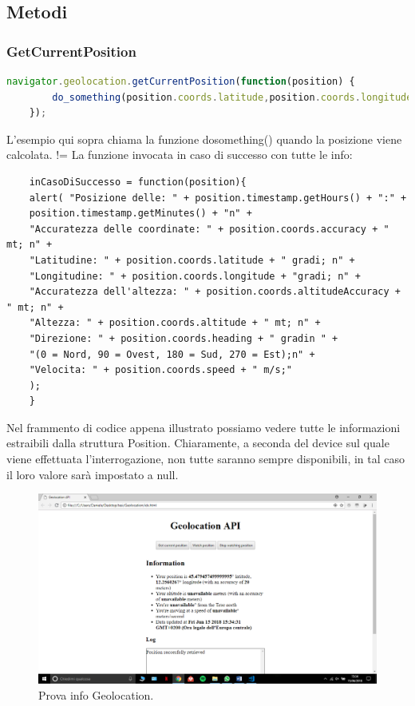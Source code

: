 \documentclass[italian]{article}
\begin{document}
	\subsection{Metodi}
	\subsubsection{GetCurrentPosition}
	\begin{lstlisting}[language=JavaScript]
	navigator.geolocation.getCurrentPosition(function(position) {
		do_something(position.coords.latitude,position.coords.longitude);
	});
	\end{lstlisting}
	\begin{flushleft}
		L'esempio qui sopra chiama la funzione dosomething() quando la posizione viene calcolata.
		!=
		La funzione invocata in caso di successo con tutte le info:
	\end{flushleft}
\pagebreak
	\begin{lstlisting}
	inCasoDiSuccesso = function(position){ 
	alert( "Posizione delle: " + position.timestamp.getHours() + ":" +
	position.timestamp.getMinutes() + "n" + 
	"Accuratezza delle coordinate: " + position.coords.accuracy + " mt; n" + 
	"Latitudine: " + position.coords.latitude + " gradi; n" + 
	"Longitudine: " + position.coords.longitude + "gradi; n" + 
	"Accuratezza dell'altezza: " + position.coords.altitudeAccuracy + " mt; n" + 
	"Altezza: " + position.coords.altitude + " mt; n" + 
	"Direzione: " + position.coords.heading + " gradin " +
	"(0 = Nord, 90 = Ovest, 180 = Sud, 270 = Est);n" + 
	"Velocita: " + position.coords.speed + " m/s;"
	);
	}
	\end{lstlisting}
	\begin{flushleft}
		Nel frammento di codice appena illustrato possiamo vedere tutte le informazioni estraibili dalla struttura Position. Chiaramente, a seconda del device sul quale viene effettuata l’interrogazione, non tutte saranno sempre disponibili, in tal caso il loro valore sarà impostato a null. 
	\end{flushleft}
	\begin{figure}
		\centering
		\includegraphics[width=1\linewidth]{img}
		\caption{Prova info Geolocation.}
		\label{fig:Info Geolocation}
	\end{figure}
\end{document}
